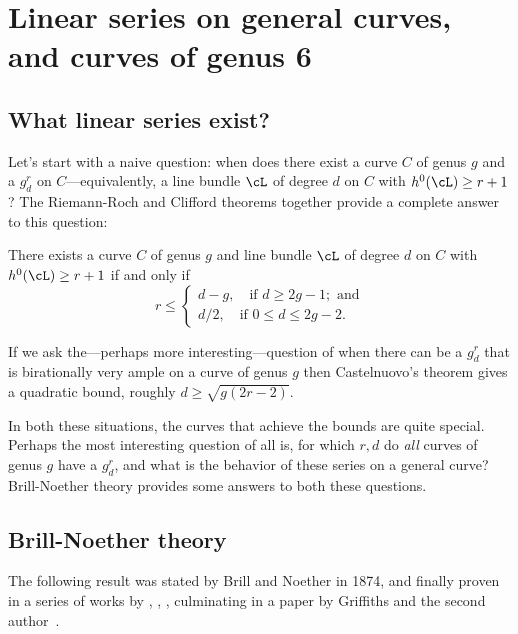 

\chapter{Linear series on general curves, and curves of genus 6}\label{Brill-Noether}\label{BNChapter}

\section{What linear series exist?}

Let's start with a naive question: when does there exist a curve $C$ of genus $g$ and a $g^r_d$ on $C$---equivalently, a line bundle $\cL$ of degree $d$ on $C$ with $h^0(\cL) \geq r+1$? The Riemann-Roch and Clifford theorems together provide a complete answer to this question:

\begin{theorem}\label{arbitrary linear series}
There exists a curve $C$ of genus $g$ and line bundle $\cL$ of degree $d$ on $C$ with $h^0(\cL) \geq r+1$ if and only if
$$
r \leq
\begin{cases}
d-g, \quad \text{if } d \geq 2g-1; \text{ and} \\
d/2,  \quad \text{if } 0 \leq d \leq 2g-2.
\end{cases}
$$
\end{theorem}


If we ask the---perhaps more interesting---question of when there can be a $g^r_d$ that is birationally
very ample on a curve of genus $g$ then Castelnuovo's theorem gives a quadratic bound, roughly $d \geq \sqrt{g(2r-2)}$.

In both these situations, the curves that achieve the bounds are quite special. Perhaps the most interesting question of all is, for which $r,d$ do \emph{all} curves of genus $g$ have a $g^r_d$, and what is the
behavior of these series on a general curve? Brill-Noether theory provides some answers to both these questions.

\section{Brill-Noether theory}

The following result was stated by Brill and Noether in 1874, and finally proven in a series of works by
\cite{Kempf}, \cite{MR323792}, \cite{MR0357398}, \cite{Kleiman-special} culminating in a paper by
Griffiths and the second author~\cite{Griffiths-Harris-BN}.

